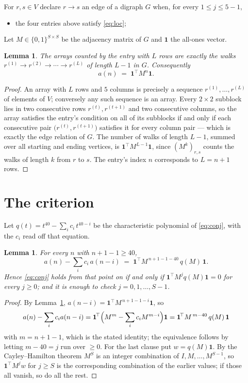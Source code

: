\documentclass[11pt,a4paper]{article}
\theoremstyle{plain}
\newtheorem{lemma}[theorem]{Lemma}
\theoremstyle{definition}
\begin{document}
For $r,s\in V$ declare $r\to s$ an edge of a digraph $G$ when, for every
$1\le j\le 5-1$,
\begin{itemize}
\item the four entries above satisfy \eqref{eq:loc};

\end{itemize}
Let $M\in\{0,1\}^{S\times S}$ be the adjacency matrix of $G$ and $\mathbf{1}$ the
all-ones vector.

\begin{lemma}\label{lem:walk}
The arrays counted by the entry with $L$ rows are exactly the walks
$r^{(1)}\to r^{(2)}\to\cdots\to r^{(L)}$ of length $L-1$ in $G$. Consequently
\[
a(n)\;=\;\mathbf{1}^{\!\top}M^{n}\mathbf{1} .
\]
\end{lemma}

\begin{proof}
An array with $L$ rows and $5$ columns is precisely a sequence
$r^{(1)},\dots,r^{(L)}$ of elements of $V$; conversely any such sequence is an array.
Every $2\times2$ subblock lies in two consecutive rows $r^{(t)},r^{(t+1)}$ and two
consecutive columns, so the array satisfies the entry's condition on all of its subblocks
if and only if each consecutive pair $\bigl(r^{(t)},r^{(t+1)}\bigr)$ satisfies it for
every column pair --- which is exactly the edge relation of $G$. The number of walks of
length $L-1$, summed over all starting and ending vertices, is
$\mathbf{1}^{\!\top}M^{L-1}\mathbf{1}$, since $(M^{k})_{r,s}$ counts the walks of
length $k$ from $r$ to $s$. The entry's index $n$ corresponds to $L=n+1$ rows.
\end{proof}

\section{The criterion}

Let $q(t)=t^{40}-\sum_i c_i\,t^{40-i}$ be the characteristic polynomial of
\eqref{eq:conj}, with the $c_i$ read off that equation.

\begin{lemma}\label{lem:crit}
For every $n$ with $n+1-1\ge40$,
\[
a(n)-\sum_i c_i\,a(n-i)\;=\;\mathbf{1}^{\!\top}M^{\,n+1-1-40}\,q(M)\,\mathbf{1} .
\]
Hence \eqref{eq:conj} holds from that point on if and only if
$\mathbf{1}^{\!\top}M^{j}q(M)\mathbf{1}=0$ for every $j\ge0$; and it is enough to check
$j=0,1,\dots,S-1$.
\end{lemma}

\begin{proof}
By Lemma~\ref{lem:walk}, $a(n-i)=\mathbf{1}^{\!\top}M^{\,n+1-1-i}\mathbf{1}$, so
\[
a(n)-\sum_i c_i a(n-i)
=\mathbf{1}^{\!\top}\Bigl(M^{m}-\sum_i c_i M^{m-i}\Bigr)\mathbf{1}
=\mathbf{1}^{\!\top}M^{\,m-40}\,q(M)\,\mathbf{1}
\]
with $m=n+1-1$, which is the stated identity; the equivalence follows by letting
$m-40=j$ run over $\ge0$. For the last clause put $w=q(M)\mathbf{1}$. By the
Cayley--Hamilton theorem $M^{S}$ is an integer combination of $I,M,\dots,M^{S-1}$, so
$\mathbf{1}^{\!\top}M^{j}w$ for $j\ge S$ is the corresponding combination of the earlier
values; if those all vanish, so do all the rest.
\end{proof}
\end{document}
